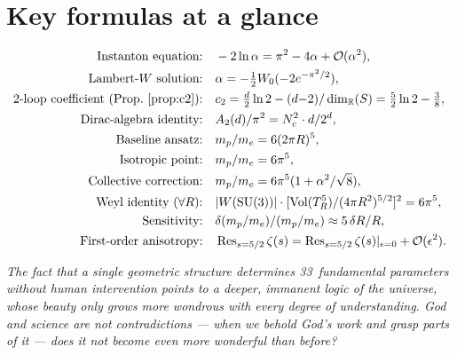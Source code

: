 \documentclass[11pt,a4paper]{article}
\theoremstyle{definition}
\theoremstyle{remark}
\begin{document}
\section*{Key formulas at a glance}
\begin{align*}
  \text{Instanton equation:}\quad
    & -2\ln\alpha = \pi^2 - 4\alpha + \mathcal{O}(\alpha^2),\\
  \text{Lambert-}W\text{ solution:}\quad
    & \alpha = -\tfrac12 W_0(-2e^{-\pi^2/2}),\\
  \text{2-loop coefficient (Prop.~\ref{prop:c2}):}\quad
    & c_2 = \tfrac{d}{2}\ln 2 - (d{-}2)/\dim_\mathbb{R}(S)
      = \tfrac52\ln 2 - \tfrac38,\\
  \text{Dirac-algebra identity:}\quad
    & A_2(d)/\pi^2 = N_c^2\cdot d/2^d,\\
  \text{Baseline ansatz:}\quad
    & m_p/m_e = 6(2\pi R)^5,\\
  \text{Isotropic point:}\quad
    & m_p/m_e = 6\pi^5,\\
  \text{Collective correction:}\quad
    & m_p/m_e = 6\pi^5(1+\alpha^2/\sqrt{8}),\\
  \text{Weyl identity (}\forall R\text{):}\quad
    & |W(\mathrm{SU}(3))|\cdot
      [\mathrm{Vol}(T^5_R)/(4\pi R^2)^{5/2}]^2 = 6\pi^5,\\
  \text{Sensitivity:}\quad
    & \delta(m_p/m_e)/(m_p/m_e) \approx 5\,\delta R/R,\\
  \text{First-order anisotropy:}\quad
    & \operatorname{Res}_{s=5/2}\zeta(s)
      = \operatorname{Res}_{s=5/2}\zeta(s)|_{\epsilon=0}
        + \mathcal{O}(\epsilon^2).
\end{align*}

\vfill

\begin{center}
\begin{minipage}{0.88\textwidth}
\small\itshape
The fact that a single geometric structure determines 33~fundamental
parameters without human intervention points to a deeper, immanent
logic of the universe, whose beauty only grows more wondrous with
every degree of understanding. God and science are not contradictions
--- when we behold God's work and grasp parts of it --- does it not
become even more wonderful than before?
\end{minipage}
\end{center}
\end{document}
